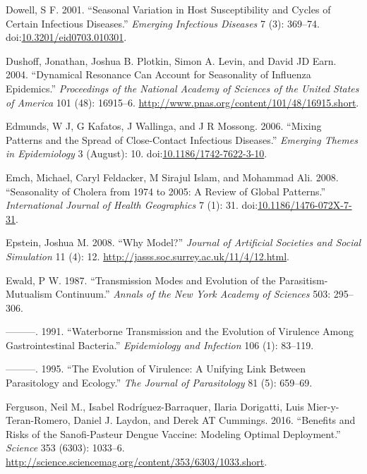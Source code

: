 \documentclass[]{book}
\theoremstyle{definition}
\theoremstyle{definition}
\theoremstyle{definition}
\theoremstyle{remark}
\begin{document}
\hypertarget{ref-dowell01}{}
Dowell, S F. 2001. ``Seasonal Variation in Host Susceptibility and
Cycles of Certain Infectious Diseases.'' \emph{Emerging Infectious
Diseases} 7 (3): 369--74.
doi:\href{https://doi.org/10.3201/eid0703.010301}{10.3201/eid0703.010301}.

\hypertarget{ref-dushoff04}{}
Dushoff, Jonathan, Joshua B. Plotkin, Simon A. Levin, and David JD Earn.
2004. ``Dynamical Resonance Can Account for Seasonality of Influenza
Epidemics.'' \emph{Proceedings of the National Academy of Sciences of
the United States of America} 101 (48): 16915--6.
\url{http://www.pnas.org/content/101/48/16915.short}.

\hypertarget{ref-edmunds06}{}
Edmunds, W J, G Kafatos, J Wallinga, and J R Mossong. 2006. ``Mixing
Patterns and the Spread of Close-Contact Infectious Diseases.''
\emph{Emerging Themes in Epidemiology} 3 (August): 10.
doi:\href{https://doi.org/10.1186/1742-7622-3-10}{10.1186/1742-7622-3-10}.

\hypertarget{ref-emch08}{}
Emch, Michael, Caryl Feldacker, M Sirajul Islam, and Mohammad Ali. 2008.
``Seasonality of Cholera from 1974 to 2005: A Review of Global
Patterns.'' \emph{International Journal of Health Geographics} 7 (1):
31.
doi:\href{https://doi.org/10.1186/1476-072X-7-31}{10.1186/1476-072X-7-31}.

\hypertarget{ref-epstein08}{}
Epstein, Joshua M. 2008. ``Why Model?'' \emph{Journal of Artificial
Societies and Social Simulation} 11 (4): 12.
\url{http://jasss.soc.surrey.ac.uk/11/4/12.html}.

\hypertarget{ref-ewald87}{}
Ewald, P W. 1987. ``Transmission Modes and Evolution of the
Parasitism-Mutualism Continuum.'' \emph{Annals of the New York Academy
of Sciences} 503: 295--306.

\hypertarget{ref-ewald91}{}
---------. 1991. ``Waterborne Transmission and the Evolution of
Virulence Among Gastrointestinal Bacteria.'' \emph{Epidemiology and
Infection} 106 (1): 83--119.

\hypertarget{ref-ewald95}{}
---------. 1995. ``The Evolution of Virulence: A Unifying Link Between
Parasitology and Ecology.'' \emph{The Journal of Parasitology} 81 (5):
659--69.

\hypertarget{ref-ferguson16}{}
Ferguson, Neil M., Isabel Rodríguez-Barraquer, Ilaria Dorigatti, Luis
Mier-y-Teran-Romero, Daniel J. Laydon, and Derek AT Cummings. 2016.
``Benefits and Risks of the Sanofi-Pasteur Dengue Vaccine: Modeling
Optimal Deployment.'' \emph{Science} 353 (6303): 1033--6.
\url{http://science.sciencemag.org/content/353/6303/1033.short}.
\end{document}

